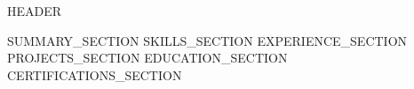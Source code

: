 \documentclass[letterpaper,11pt]{article}
\begin{document}
{{HEADER}}

{{SUMMARY_SECTION}}
{{SKILLS_SECTION}}
{{EXPERIENCE_SECTION}}
{{PROJECTS_SECTION}}
{{EDUCATION_SECTION}}
{{CERTIFICATIONS_SECTION}}
\end{document}
